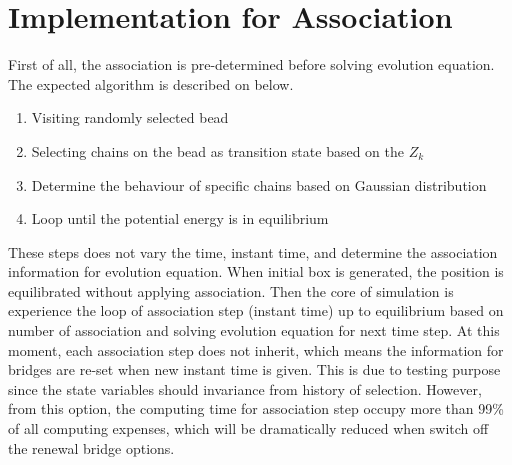 \message{ !name(brief_Brownian_dynamics.tex)}\documentclass[10pt, a4paper]{report}
\begin{document}
\section{Implementation for Association}

First of all, the association is pre-determined before solving evolution equation. The expected algorithm is described on below.
\begin{enumerate}
\item Visiting randomly selected bead
\item Selecting chains on the bead as transition state based on the $Z_k$
\item Determine the behaviour of specific chains based on Gaussian distribution
\item Loop until the potential energy is in equilibrium
\end{enumerate}
These steps does not vary the time, instant time, and determine the association information for evolution equation. When initial box is generated, the position is equilibrated without applying association. Then the core of simulation is experience the loop of association step (instant time) up to equilibrium based on number of association and solving evolution equation for next time step. At this moment, each association step does not inherit, which means the information for bridges are re-set when new instant time is given. This is due to testing purpose since the state variables should invariance from history of selection. However, from this option, the computing time for association step occupy more than 99{\%} of all computing expenses, which will be dramatically reduced when switch off the renewal bridge options.
\end{document}

